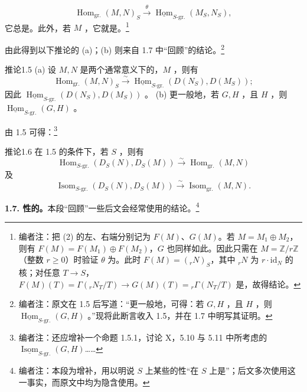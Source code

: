 \[
\operatorname{Hom}_{\mathrm{gr.}}(M,N)_S\xrightarrow{\theta}
\underline{\operatorname{Hom}}_{S\text{-}\mathrm{gr.}}(M_S,N_S),\tag{2}
\]
它总是。此外，若 $M$ ，它就是。\footnote[5]{编者注：把 (2) 的左、右端分别记为 $F(M)$、$G(M)$。若 $M=M_1\oplus M_2$，则有 $F(M)=F(M_1)\oplus F(M_2)$，$G$ 也同样如此。因此只需在 $M=\mathbb Z/r\mathbb Z$（整数 $r\geq0$）时验证 $\theta$ 为。此时 $F(M)=({}_rN)_S$，其中 ${}_rN$ 为 $r\cdot\mathrm{id}_N$ 的核；对任意 $T\to S$， $F(M)(T)=\Gamma({}_rN_T/T)\to G(M)(T)={}_r\Gamma(N_T/T)$ 是，故得结论。}

由此得到以下推论的 (a)；(b) 则来自 1.7 中“回顾”的结论。\footnote[6]{编者注：原文在 1.5 后写道：“更一般地，可得：若 $G,H$ ，且 $H$ ，则 $\underline{\operatorname{Hom}}_{S\text{-}\mathrm{gr.}}(G,H)$ 。”现将此断言收入 1.5，并在 1.7 中明写其证明。}
\begin{SGAresult}{推论}{1.5}
(a) 设 $M,N$ 是两个通常意义下的，$M$ ，则有
\[
\operatorname{Hom}_{\mathrm{gr.}}(M,N)_S\xrightarrow{\sim}
\underline{\operatorname{Hom}}_{S\text{-}\mathrm{gr.}}(D(N_S),D(M_S));
\]
因此 $\underline{\operatorname{Hom}}_{S\text{-}\mathrm{gr.}}(D(N_S),D(M_S))$ 。
(b) 更一般地，若 $G,H$ ，且 $H$ ，则 $\underline{\operatorname{Hom}}_{S\text{-}\mathrm{gr.}}(G,H)$ 。
\end{SGAresult}
由 1.5 可得：\footnote[7]{编者注：还应增补一个命题 1.5.1，讨论 X，5.10 与 5.11 中所考虑的 $\underline{\operatorname{Isom}}_{S\text{-}\mathrm{gr.}}(G,H)$……}
\begin{SGAresult}{推论}{1.6}
在 1.5 的条件下，若 $S$ ，则有
\[
\operatorname{Hom}_{S\text{-}\mathrm{gr.}}(D_S(N),D_S(M))\xrightarrow{\sim}\operatorname{Hom}_{\mathrm{gr.}}(M,N)
\]
及
\[
\operatorname{Isom}_{S\text{-}\mathrm{gr.}}(D_S(N),D_S(M))\xrightarrow{\sim}\operatorname{Isom}_{\mathrm{gr.}}(M,N).
\]
\end{SGAresult}
\textbf{1.7. 性的。}本段“回顾”一些后文会经常使用的结论。\footnote[8]{编者注：本段为增补，用以明说 $S$ 上某些的性“在 $S$ 上是”；后文多次使用这一事实，而原文中均为隐含使用。}
